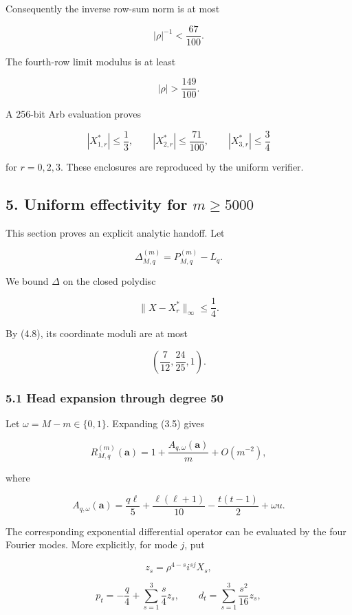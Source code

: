 \documentclass[
  11pt,
  a4paper,
]{article}
\begin{document}
Consequently the inverse row-sum norm is at most

\[
|\rho|^{-1}<\frac{67}{100}.
\tag{4.6}
\]

The fourth-row limit modulus is at least

\[
|\rho|>\frac{149}{100}.
\tag{4.7}
\]

A 256-bit Arb evaluation proves

\[
|X^*_{1,r}|\le\frac13,\qquad
|X^*_{2,r}|\le\frac{71}{100},\qquad
|X^*_{3,r}|\le\frac34
\tag{4.8}
\]

for \(r=0,2,3\). These enclosures are reproduced by the uniform
verifier.

\subsection{\texorpdfstring{5. Uniform effectivity for
\(m\ge5000\)}{5. Uniform effectivity for m\textbackslash ge5000}}\label{uniform-effectivity-for-mge5000}

This section proves an explicit analytic handoff. Let

\[
\Delta^{(m)}_{M,q}=P^{(m)}_{M,q}-L_q.
\]

We bound \(\Delta\) on the closed polydisc

\[
\|X-X_r^*\|_\infty\le\frac14.
\tag{5.1}
\]

By (4.8), its coordinate moduli are at most

\[
\left(\frac7{12},\frac{24}{25},1\right).
\tag{5.2}
\]

\subsubsection{5.1 Head expansion through degree
50}\label{head-expansion-through-degree-50}

Let \(\omega=M-m\in\{0,1\}\). Expanding (3.5) gives

\[
R^{(m)}_{M,q}(\mathbf a)
=1+\frac{A_{q,\omega}(\mathbf a)}m+O(m^{-2}),
\tag{5.3}
\]

where

\[
A_{q,\omega}(\mathbf a)=
\frac{q\ell}{5}+\frac{\ell(\ell+1)}{10}
-\frac{t(t-1)}2+\omega u.
\tag{5.4}
\]

The corresponding exponential differential operator can be evaluated by
the four Fourier modes. More explicitly, for mode \(j\), put

\[
z_s=\rho^{4-s}i^{sj}X_s,
\]

\[
p_t=-\frac q4+\sum_{s=1}^3\frac{s}{4}z_s,
\qquad
d_t=\sum_{s=1}^3\frac{s^2}{16}z_s,
\]
\end{document}
